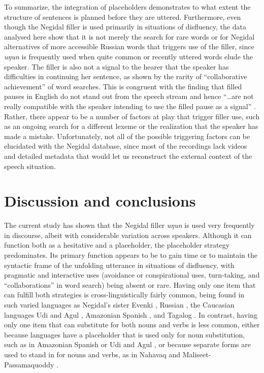 \documentclass[output=paper]{langscibook}
\begin{document}
To summarize, the integration of placeholders demonstrates to what extent the structure of sentences is planned before they are uttered. Furthermore, even though the Negidal filler is used primarily in situations of disfluency, the data analysed here show that it is not merely the search for rare words or for Negidal alternatives of more accessible Russian words that triggers use of the filler, since \textit{uŋun} is frequently used when quite common or recently uttered words elude the speaker. The filler is also not a signal to the hearer that the speaker has difficulties in continuing her sentence, as shown by the rarity of “collaborative achievement” of word searches. This is congruent with the finding that filled pauses in English do not stand out from the speech stream and hence “…are not really compatible with the speaker intending to use the filled pause as a signal” \citep[459]{Lickley2015}. Rather, there appear to be a number of factors at play that trigger filler use, such as an ongoing search for a different lexeme or the realization that the speaker has made a mistake. Unfortunately, not all of the possible triggering factors can be elucidated with the Negidal database, since most of the recordings lack videos and detailed metadata that would let us reconstruct the external context of the speech situation.

\section{Discussion and conclusions}
\label{sec:pakendorf:6}

The current study has shown that the Negidal filler \textit{uŋun} is used very frequently in discourse, albeit with considerable variation across speakers. Although it can function both as a hesitative and a placeholder, the placeholder strategy predominates. Its primary function appears to be to gain time or to maintain the syntactic frame of the unfolding utterance in situations of disfluency, with pragmatic and interactive uses (avoidance or conspirational uses, turn-taking, and “collaborations” in word search) being absent or rare. Having only one item that can fulfill both strategies is cross-linguistically fairly common, being found in such varied languages as Negidal’s sister Evenki \citep{Klyachko2022}, Russian \citep{Podlesskaya2010}, the Caucasian languages Udi and Agul \citep{GanenkovGanenkov2010}, Amazonian Spanish \citep{Vallejos-Yopán2023}, and Tagalog \citep{Nagaya2022}. In contrast, having only one item that can substitute for both nouns and verbs is less common, either because languages have a placeholder that is used only for noun substitution, such as in Amazonian Spanish \citep{Vallejos-Yopán2023} or Udi and Agul \citep{GanenkovGanenkov2010}, or because separate forms are used to stand in for nouns and verbs, as in Nahavaq \citep{Dimock2010} and Maliseet\hyp Passamaquoddy \citep{LeSourd2003}. 
\end{document}
